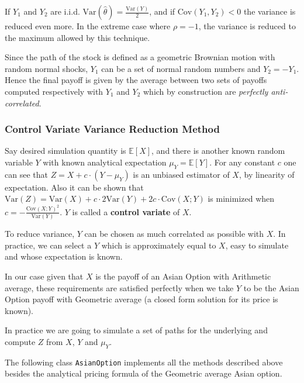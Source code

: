 If $Y_1$ and $Y_2$ are i.i.d. $\text{Var}(\hat{\theta})=\frac{\text{Var}(Y)}{2}$, and if $\text{Cov}(Y_1, Y_2)<0$ the variance is reduced even more. In the extreme case where $\rho=-1$, the variance is reduced to the maximum allowed by this technique. 

Since the path of the stock is defined as a geometric Brownian motion with random normal shocks, $Y_1$ can be a set of normal random numbers and $Y_2 = -Y_1$. Hence the final payoff is given by the average between two sets of payoffs computed respectively with $Y_1$ and $Y_2$ which by construction are \emph{perfectly anti-correlated}. 

\subsubsection{Control Variate Variance Reduction Method}

Say desired simulation quantity is $\mathbb{E}[X]$, and there is another known random variable $Y$ with known analytical expectation $\mu_Y = \mathbb{E}[Y]$. For any constant $c$ one can see that $Z = X + c\cdot(Y -\mu_Y)$ is an unbiased estimator of $X$, by linearity of expectation. Also it can be shown that $\text{Var}(Z) = \text{Var}(X) + c\cdot 2 \text{Var}(Y) + 2c\cdot\text{Cov}(X; Y)$ is minimized when $c = -\frac{\text{Cov}(X;Y)^2}{\text{Var}(Y)}$. 
$Y$ is called a \textbf{control variate} of $X$. 

To reduce variance, $Y$ can be chosen as much correlated as possible with $X$. In practice, we can select a $Y$ which is approximately equal to $X$, easy to simulate and whose expectation is known. 

In our case given that $X$ is the payoff of an Asian Option with Arithmetic average, these requirements are satisfied perfectly when we take $Y$ to be the Asian Option payoff with Geometric average (a closed form solution for its price is known).

In practice we are going to simulate a set of paths for the underlying and compute $Z$ from  $X$, $Y$ and $\mu_Y$.

\begin{finmarkets}
The following class \texttt{AsianOption} implements all the methods described above besides the analytical pricing formula of the Geometric average Asian option.
\end{finmarkets}

